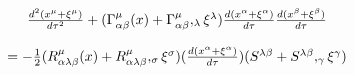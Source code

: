 \begin{equation}
\begin{array}{c}
\frac{d^{2}(x^{\mu }+\xi ^{\mu })}{d\tau ^{2}}+(\Gamma _{\alpha \beta }^{\mu
}(x)+\Gamma _{\alpha \beta }^{\mu },_{\lambda }\xi ^{\lambda })\frac{%
d(x^{\alpha }+\xi ^{\alpha })}{d\tau }\frac{d(x^{\beta }+\xi ^{\beta })}{%
d\tau } \\ 
\\ 
=-\frac{1}{2}(R_{\alpha \lambda \beta }^{\mu }(x)+R_{\alpha \lambda \beta
}^{\mu },_{\sigma }\xi ^{\sigma })(\frac{d(x^{\alpha }+\xi ^{\alpha })}{%
d\tau })(S^{\lambda \beta }+S^{\lambda \beta },_{\gamma }\xi ^{\gamma })
\end{array}
\label{19}
\end{equation}

